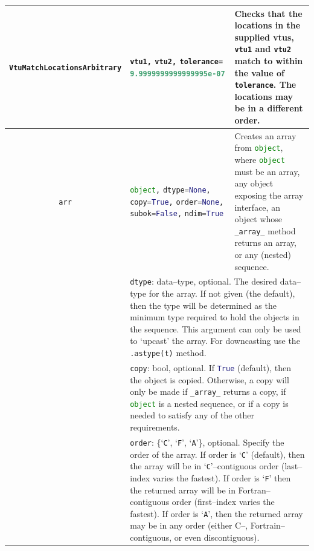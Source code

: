 \begin{landscape}
\begin{longtable}{|c | p{} |p{}|}
%
\lstinline[language=Python]+VtuMatchLocationsArbitrary+ & \lstinline[language=Python]+vtu1,+ \lstinline[language=Python]+vtu2,+ \lstinline[language=Python]+tolerance=+ \lstinline[language=Python]+9.9999999999999995e-07+ & Checks that the locations in the supplied vtus, \lstinline[language=Python]+vtu1+ and \lstinline[language=Python]+vtu2+ match to within the value of \lstinline[language=Python]+tolerance+. The locations may be in a different order. \\ \hline
\lstinline[language=Python]+arr+ & \lstinline[language=Python]+object,+ \lstinline[language=Python]+dtype=None,+ \lstinline[language=Python]+copy=True,+ \lstinline[language=Python]+order=None,+ \lstinline[language=Python]+subok=False,+ \lstinline[language=Python]+ndim=True+ & Creates an array from \lstinline[language=Python]+object+, where \lstinline[language=Python]+object+ must be an array, any object exposing the array interface, an object whose \lstinline[language=Python]+_array_+ method returns an array, or any (nested) sequence. \\
& \multicolumn{2}{p{1.05\textwidth}|}{\lstinline[language=Python]+dtype+: data--type, optional. The desired data--type for the array. If not given (the default), then the type will be determined as the minimum type required to hold the objects in the sequence. This argument can only be used to `upcast' the array. For downcasting use the \lstinline[language=Python]+.astype(t)+ method.} \\
& \multicolumn{2}{p{1.05\textwidth}|}{\lstinline[language=Python]+copy+: bool, optional. If \lstinline[language=Python]+True+ (default), then the object is copied. Otherwise, a copy will only be made if \lstinline[language=Python]+_array_+ returns a copy, if \lstinline[language=Python]+object+ is a nested sequence, or if a copy is needed to satisfy any of the other requirements.} \\
& \multicolumn{2}{p{1.05\textwidth}|}{\lstinline[language=Python]+order+: \{`\lstinline[language=Python]+C+', `\lstinline[language=Python]+F+', `\lstinline[language=Python]+A+'\}, optional. Specify the order of the array. If order is `\lstinline[language=Python]+C+' (default), then the array will be in `\lstinline[language=Python]+C+'--contiguous order (last--index varies the fastest). If order is `\lstinline[language=Python]+F+' then the returned array will be in Fortran--contiguous order (first--index varies the fastest). If order is `\lstinline[language=Python]+A+', then the returned array may be in any order (either C--, Fortrain--contiguous, or even discontiguous).} \\

\end{longtable}
\end{landscape}
